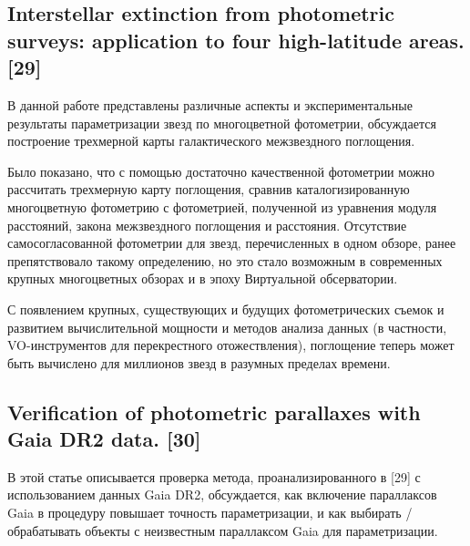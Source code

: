\documentclass[12pt, a4paper]{article}
\begin{document}
	\subsection*{Interstellar extinction from photometric surveys: application to four high-latitude areas. [29]}
	В данной работе представлены различные аспекты и экспериментальные результаты параметризации звезд по многоцветной фотометрии, обсуждается построение трехмерной карты галактического межзвездного поглощения.

	Было показано, что с помощью достаточно качественной фотометрии можно рассчитать трехмерную карту поглощения, сравнив каталогизированную многоцветную фотометрию с фотометрией, полученной из уравнения модуля расстояний, закона межзвездного поглощения и расстояния. Отсутствие самосогласованной фотометрии для звезд, перечисленных в одном обзоре, ранее препятствовало такому определению, но это стало возможным в современных крупных многоцветных обзорах и в эпоху Виртуальной обсерватории.

	С появлением крупных, существующих и будущих фотометрических съемок и развитием вычислительной мощности и методов анализа данных (в частности, VO-инструментов для перекрестного отожествления), поглощение теперь может быть вычислено для миллионов звезд в разумных пределах времени.

	\subsection*{Verification of photometric parallaxes with Gaia DR2 data. [30]}
	В этой статье описывается проверка метода, проанализированного в [29] с использованием данных Gaia DR2, обсуждается, как включение параллаксов Gaia в процедуру повышает точность параметризации, и как выбирать / обрабатывать объекты с неизвестным параллаксом Gaia для параметризации.
\end{document}
